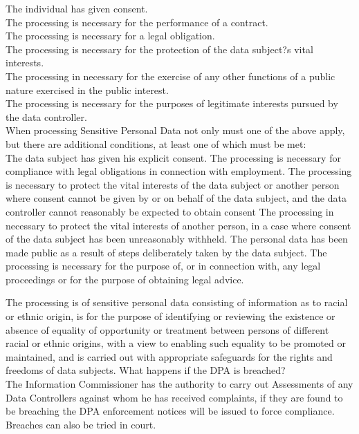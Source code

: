 \documentclass[11pt]{article} %
\begin{document}
The individual has given consent.\\
The processing is necessary for the performance of a contract.\\
The processing is necessary for a legal obligation.\\
The processing is necessary for the protection of the data subject?s vital interests.\\
The processing in necessary for the exercise of any other functions of a public nature exercised in the public interest.\\
The processing is necessary for the purposes of legitimate interests pursued by the data controller.\\
When processing Sensitive Personal Data not only must one of the above apply, but there are additional conditions, at least one of which must be met:\\

The data subject has given his explicit consent.
The processing is necessary for compliance with legal obligations in connection with employment.
The processing is necessary to protect the vital interests of the data subject or another person where consent cannot be given by or on behalf of the data subject, and the data controller cannot reasonably be expected to obtain consent
The processing in necessary to protect the vital interests of another person, in a case where consent of the data subject has been unreasonably withheld.
The personal data has been made public as a result of steps deliberately taken by the data subject.
The processing is necessary for the purpose of, or in connection with, any legal proceedings or for the purpose of obtaining legal advice.

The processing is of sensitive personal data consisting of information as to racial or ethnic origin, is for the purpose of identifying or reviewing the existence or absence of equality of opportunity or treatment between persons of different racial or ethnic origins, with a view to enabling such equality to be promoted or maintained, and is carried out with appropriate safeguards for the rights and freedoms of data subjects.
What happens if the DPA is breached?\\
The Information Commissioner has the authority to carry out Assessments of any Data Controllers against whom he has received complaints, if they are found to be breaching the DPA enforcement notices will be issued to force compliance. Breaches can also be tried in court.\\
\end{document}
